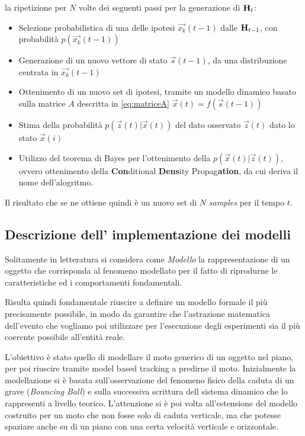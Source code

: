 la ripetizione per $N$ volte dei seguenti passi per la generazione di $\mbox{{\bfseries H}}_t$:
\begin{itemize}
\item Selezione probabilistica di una delle ipotesi $\overrightarrow{x_k}(t-1)$ dalle $\mbox{{\bfseries H}}_{t-1}$, con probabilità $p(\overrightarrow{x_k}(t-1))$
\item Generazione di un nuovo vettore di stato $\overrightarrow{s}(t-1)$, da una distribuzione centrata in   $\overrightarrow{x_k}(t-1)$
\item Ottenimento di un nuovo set di ipotesi, tramite un modello dinamico basato sulla matrice $A$ descritta in \ref{eq:matriceA} $\overrightarrow{x}(t)=f(\overrightarrow{s}(t-1))$
\item Stima della probabilità $p(\overrightarrow{z}(t)|\overrightarrow{x}(t))$ del dato osservato $\overrightarrow{z}(t)$ dato lo stato $\overrightarrow{x}(i)$
\item Utilizzo del teorema di Bayes per l'ottenimento della $p(\overrightarrow{x}(t)|\overrightarrow{z}(t))$, ovvero ottenimento della \textbf{Con}ditional \textbf{Dens}ity Propag\textbf{ation}, da cui deriva il nome dell'alogritmo.
\end{itemize}

Il risultato che se ne ottiene quindi è un nuovo set di $N$ \textit{samples} per il tempo $t$.
\subsection{Descrizione dell' implementazione dei modelli} \label{sec:modelli}
Solitamente in letteratura si considera come \textit{Modello} la rappresentazione di un oggetto che corrisponda al fenomeno modellato per il fatto  di riprodurne le caratteristiche ed i comportamenti fondamentali. 

Risulta quindi fondamentale riuscire a definire un modello formale il più precisamente possibile, in modo da garantire che l'astrazione matematica dell'evento che vogliamo poi utilizzare per l'esecuzione degli esperimenti sia il più coerente possibile all'entità reale. 

L'obiettivo è stato quello di modellare il moto generico di un oggetto nel piano, per poi riuscire tramite model based tracking a predirne il moto. Inizialmente la modellazione si è basata sull'osservazione del fenomeno fisico della caduta di un grave (\textit{Bouncing Ball}) e sulla successiva scrittura dell sistema dinamico che lo rappresenti a livello teorico. L'attenzione si è poi volta all'estensione del modello costruito per un moto che non fosse solo di caduta verticale, ma che potesse spaziare anche su di un piano con una certa velocità verticale e orizzontale. 

